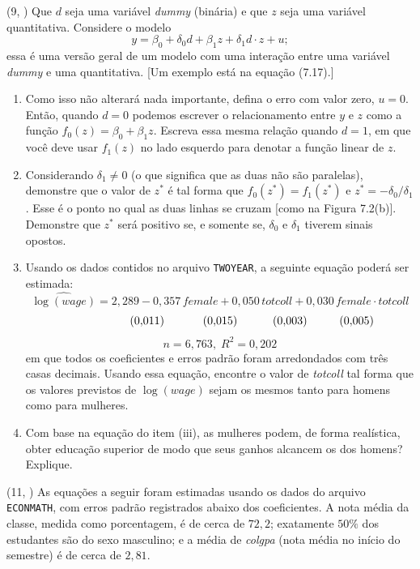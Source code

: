 \documentclass[12pt,letterpaper, onecolumn]{exam}
\begin{document}
\begin{questions}
\question (9, \citep{wooldridge2016}) Que \(d\) seja uma variável \textit{dummy} (binária) e que \(z\) seja uma variável quantitativa. Considere o modelo
\[
y = \beta_0 + \delta_0 d + \beta_1 z + \delta_1 d \cdot z + u;
\]
essa é uma versão geral de um modelo com uma interação entre uma variável \textit{dummy} e uma quantitativa. [Um exemplo está na equação (7.17).]
\begin{enumerate}[label=(\roman*)]
    \item Como isso não alterará nada importante, defina o erro com valor zero, \(u=0\). Então, quando \(d=0\) podemos escrever o relacionamento entre \(y\) e \(z\) como a função \(f_0(z)=\beta_0+\beta_1 z\). Escreva essa mesma relação quando \(d=1\), em que você deve usar \(f_1(z)\) no lado esquerdo para denotar a função linear de \(z\).
    \item Considerando \(\delta_1 \neq 0\) (o que significa que as duas não são paralelas), demonstre que o valor de \(z^\ast\) é tal forma que \(f_0(z^\ast)=f_1(z^\ast)\) e \(z^\ast = -\delta_0/\delta_1\). Esse é o ponto no qual as duas linhas se cruzam [como na Figura 7.2(b)]. Demonstre que \(z^\ast\) será positivo se, e somente se, \(\delta_0\) e \(\delta_1\) tiverem sinais opostos.
    \item Usando os dados contidos no arquivo \texttt{TWOYEAR}, a seguinte equação poderá ser estimada:
    \[
    \widehat{\log(wage)} = 2{,}289 - 0{,}357\,female + 0{,}050\,totcoll + 0{,}030\,female \cdot totcoll
    \]
    \[
    \hspace{2.0cm} (0{,}011)\hspace{1.2cm}(0{,}015)\hspace{1.1cm}(0{,}003)\hspace{1.0cm}(0{,}005)
    \]
    \[
    n = 6{,}763,\; R^2 = 0{,}202
    \]
    em que todos os coeficientes e erros padrão foram arredondados com três casas decimais. Usando essa equação, encontre o valor de \textit{totcoll} tal forma que os valores previstos de \(\log(wage)\) sejam os mesmos tanto para homens como para mulheres.
    \item Com base na equação do item (iii), as mulheres podem, de forma realística, obter educação superior de modo que seus ganhos alcancem os dos homens? Explique.
\end{enumerate}

\vspace{0.7cm}

\question (11, \citep{wooldridge2016}) As equações a seguir foram estimadas usando os dados do arquivo \texttt{ECONMATH}, com erros padrão registrados abaixo dos coeficientes. A nota média da classe, medida como porcentagem, é de cerca de \(72{,}2\); exatamente \(50\%\) dos estudantes são do sexo masculino; e a média de \textit{colgpa} (nota média no início do semestre) é de cerca de \(2{,}81\).


\end{questions}
\end{document}
